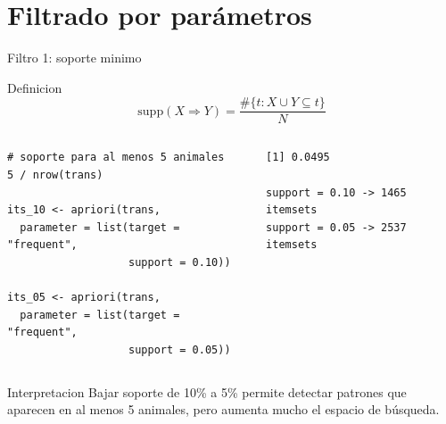 \documentclass[10pt,aspectratio=169]{beamer}
\begin{document}
\section{Filtrado por parámetros}
\begin{frame}[fragile]{Filtro 1: soporte minimo}
\begin{block}{Definicion}
\[
\mathrm{supp}(X \Rightarrow Y) = \frac{\#\{t: X \cup Y \subseteq t\}}{N}
\]
\end{block}

\begin{columns}[T]
\begin{lstlisting}[style=rcode]
# soporte para al menos 5 animales
5 / nrow(trans)

its_10 <- apriori(trans,
  parameter = list(target = "frequent",
                   support = 0.10))

its_05 <- apriori(trans,
  parameter = list(target = "frequent",
                   support = 0.05))
\end{lstlisting}

\begin{lstlisting}[style=out]
[1] 0.0495

support = 0.10 -> 1465 itemsets
support = 0.05 -> 2537 itemsets
\end{lstlisting}
\end{columns}

\begin{alertblock}{Interpretacion}
Bajar soporte de 10\% a 5\% permite detectar patrones que aparecen en al menos 5 animales, pero aumenta mucho el espacio de búsqueda.
\end{alertblock}
\end{frame}
\end{document}
